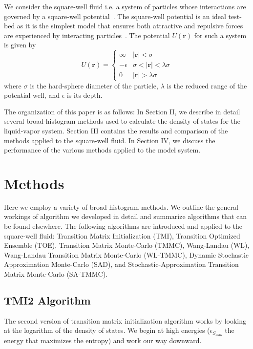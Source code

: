 \documentclass[letterpaper,twocolumn,amsmath,amssymb,pre,aps,10pt]{revtex4-1}
\begin{document}
We consider the square-well fluid i.e. a system of particles whose
interactions are governed by a square-well
potential~\cite{singh2003surface, barker2004perturbationSW}.  The
square-well potential is an ideal test-bed as it is the simplest model
that ensures both attractive and repulsive forces are experienced by
interacting particles~\cite{barker1967-SW-perturbation, vega1992phase}.
The potential $U(\textbf{r})$ for such a system is given by
\begin{equation}
 U(\textbf{r})=\begin{cases} \infty &
 \lvert\textbf{r}\rvert< \sigma\\-\epsilon &
 \sigma<\lvert\textbf{r}\rvert<\lambda\sigma\\0 &
 \lvert\textbf{r}\rvert > \lambda\sigma\end{cases}
\end{equation}
where $\sigma$ is the hard-sphere diameter of the particle, $\lambda$ is the
reduced range of the potential well, and $\epsilon$ is its depth.

The organization of this paper is as follows: In Section II, we
describe in detail several broad-histogram methods used to calculate
the density of states for the liquid-vapor system.  Section III
contains the results and comparison of the methods applied to the
square-well fluid.  In Section IV, we discuss the performance of the
various methods applied to the model system.

\section{Methods}

Here we employ a variety of broad-histogram methods.  We outline the
general workings of algorithm we developed in detail and summarize
algorithms that can be found elsewhere.  The following algorithms are
introduced and applied to the square-well fluid: Transition Matrix
Initialization (TMI), Transition Optimized Ensemble (TOE), Transition
Matrix Monte-Carlo (TMMC), Wang-Landau (WL), Wang-Landau Transition
Matrix Monte-Carlo (WL-TMMC), Dynamic Stochastic Approximation
Monte-Carlo (SAD), and Stochastic-Approximation Transition Matrix
Monte-Carlo (SA-TMMC).

\subsection{TMI2 Algorithm}

The second version of transition matrix initialization algorithm works
by looking at the logarithm of the density of states.  We begin at
high energies ($\epsilon_{S_{\max}}$ the energy that maximizes the entropy) and work our way
downward.
\end{document}
